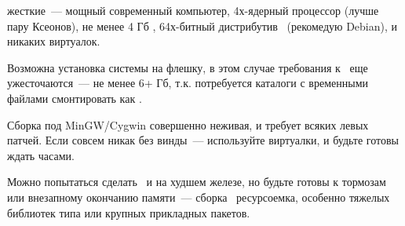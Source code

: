 
\secdown



жесткие\ --- мощный современный компьютер, 4х-ядерный процессор (лучше пару
Ксеонов), не менее 4 Гб \ram, 64х-битный дистрибутив \linux\ (рекомедую Debian),
и никаких виртуалок.

Возможна установка системы на флешку, в этом случае требования к \ram\ еще
ужесточаются\ --- не менее 6+ Гб, т.к. потребуется каталоги с временными файлами
смонтировать как .

Сборка под MinGW/Cygwin совершенно неживая, и требует всяких левых патчей.
Если совсем никак без винды\ --- используйте виртуалки, и будьте готовы ждать
часами.

Можно попытаться сделать \ и на худшем железе, но будьте
готовы к тормозам или внезапному окончанию памяти\ --- сборка \emlinux\
ресурсоемка, особенно тяжелых библиотек типа  или крупных
прикладных пакетов.


\secup
